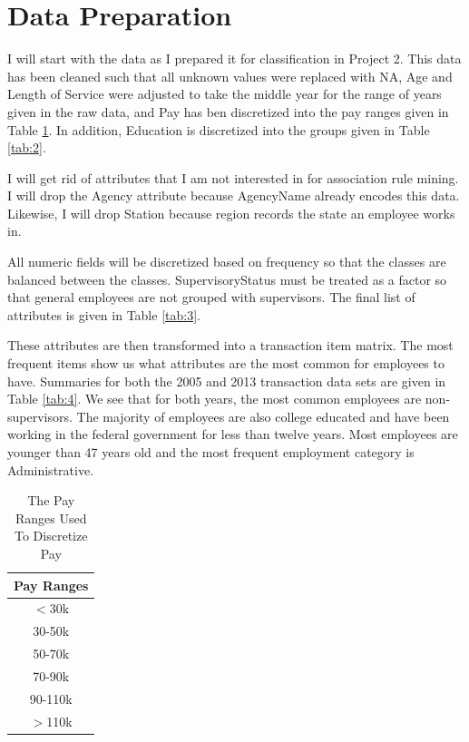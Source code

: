 \documentclass{article}
\begin{document}
\section{Data Preparation}
I will start with the data as I prepared it for classification in Project 2. This data has been cleaned such that all unknown values were replaced with NA, Age and Length of Service were adjusted to take the middle year for the range of years given in the raw data, and Pay has ben discretized into the pay ranges given in Table \ref{tab:1}. In addition, Education is discretized into the groups given in Table \ref{tab:2}.
\par
I will get rid of attributes that I am not interested in for association rule mining. I will drop the Agency attribute because AgencyName already encodes this data. Likewise, I will drop Station because region records the state an employee works in.
\par
All numeric fields will be discretized based on frequency so that the classes are balanced between the classes. SupervisoryStatus must be treated as a factor so that general employees are not grouped with supervisors. The final list of attributes is given in Table \ref{tab:3}.
\par
These attributes are then transformed into a transaction item matrix. The most frequent items show us what attributes are the most common for employees to have. Summaries for both the 2005 and 2013 transaction data sets are given in Table \ref{tab:4}. We see that for both years, the most common employees are non-supervisors. The majority of employees are also college educated and have been working in the federal government for less than twelve years. Most employees are younger than 47 years old and the most frequent employment category is Administrative.

    \begin{center}
        \begin{table}
            \centering
            \begin{tabular}{ |c| }
                \hline
                Pay Ranges \\
                \hline
                $<$30k \\
                30-50k \\
                50-70k \\
                70-90k \\
                90-110k \\
                $>$110k \\
                \hline
            \end{tabular}
            \caption{The Pay Ranges Used To Discretize Pay}
            \label{tab:1}
        \end{table}
    \end{center}
\end{document}
